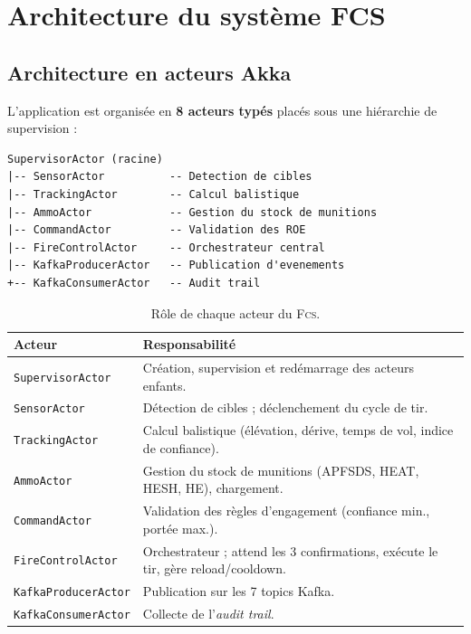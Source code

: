 \documentclass[11pt,a4paper]{article}
\newcommand{\fcs}{\textsc{Fcs}\xspace}
\newcommand{\code}[1]{\texttt{#1}}
\begin{document}
\section{Architecture du système FCS}

\subsection{Architecture en acteurs Akka}

L'application est organisée en \textbf{8 acteurs typés} placés sous une
hiérarchie de supervision :

\begin{lstlisting}[caption={Hiérarchie de supervision Akka.}]
SupervisorActor (racine)
|-- SensorActor          -- Detection de cibles
|-- TrackingActor        -- Calcul balistique
|-- AmmoActor            -- Gestion du stock de munitions
|-- CommandActor         -- Validation des ROE
|-- FireControlActor     -- Orchestrateur central
|-- KafkaProducerActor   -- Publication d'evenements
+-- KafkaConsumerActor   -- Audit trail
\end{lstlisting}

\begin{table}[H]
\centering\small
\begin{tabularx}{\linewidth}{l X}
\toprule
\rowcolor{tableheader}\textbf{Acteur} & \textbf{Responsabilité} \\
\midrule
\code{SupervisorActor}     & Création, supervision et redémarrage des acteurs enfants. \\
\code{SensorActor}         & Détection de cibles ; déclenchement du cycle de tir. \\
\code{TrackingActor}       & Calcul balistique (élévation, dérive, temps de vol, indice de confiance). \\
\code{AmmoActor}           & Gestion du stock de munitions (APFSDS, HEAT, HESH, HE), chargement. \\
\code{CommandActor}        & Validation des règles d'engagement (confiance min., portée max.). \\
\code{FireControlActor}    & Orchestrateur ; attend les 3 confirmations, exécute le tir, gère reload/cooldown. \\
\code{KafkaProducerActor}  & Publication sur les 7 topics Kafka. \\
\code{KafkaConsumerActor}  & Collecte de l'\emph{audit trail}. \\
\bottomrule
\end{tabularx}
\caption{Rôle de chaque acteur du \fcs.}
\end{table}
\end{document}
